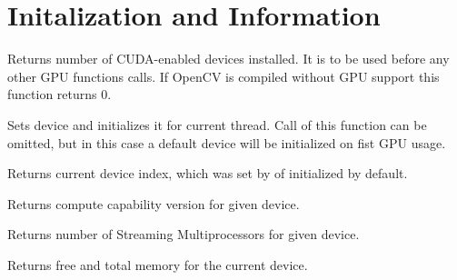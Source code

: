 \section{Initalization and Information}


Returns number of CUDA-enabled devices installed. It is to be used before any other GPU functions calls. If OpenCV is compiled without GPU support this function returns 0. 



Sets device and initializes it for current thread. Call of this function can be omitted, but in this case a default device will be initialized on fist GPU usage.

\begin{description}
\end{description}


Returns current device index, which was set by  of initialized by default.



Returns compute capability version for given device.

\begin{description}
\end{description}

Returns number of Streaming Multiprocessors for given device.

\begin{description}
\end{description}


Returns free and total memory for the current device.

\begin{description}
\end{description}


